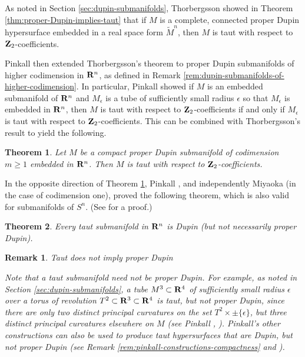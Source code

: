 \documentclass[12pt]{article}
\newtheorem{theorem}{Theorem}[section]
\newtheorem{remark}{Remark}[section]
\begin{document}
{As noted in Section \ref{sec:dupin-submanifolds},
Thorbergsson \cite{Th1} showed in Theorem \ref{thm:proper-Dupin-implies-taut}
that if $M$ is a complete, connected proper
Dupin hypersurface embedded in a real space form $\widetilde{M}^n$, then $M$ is taut with respect to 
${\bf Z}_2$-coefficients.


Pinkall \cite{P4} then extended Thorbergsson's theorem
 to proper Dupin submanifolds of higher codimension in ${\bf R}^n$, 
as defined in Remark \ref{rem:dupin-submanifolds-of-higher-codimension}.
In particular, Pinkall  showed if $M$ is an embedded submanifold of ${\bf R}^n$
and $M_{\epsilon}$ is a tube of sufficiently small radius $\epsilon$
so that $M_{\epsilon}$ is
embedded in ${\bf R}^n$, then $M$ is taut with respect to 
${\bf Z}_2$-coefficients if and only if $M_{\epsilon}$ is taut
with respect to ${\bf Z}_2$-coefficients.  This can be combined
with Thorbergsson's result to yield the following.
\begin{theorem}
\label{thm:taut-codimension-greater-than-1}
Let $M$ be a compact proper Dupin submanifold of codimension $m \geq 1$ embedded in ${\bf R}^n$.
Then $M$ is taut with respect to ${\bf Z}_2$-coefficients.
\end{theorem}

In the opposite direction of Theorem \ref{thm:taut-codimension-greater-than-1},
Pinkall \cite{P4}, and independently Miyaoka \cite{Mi8} (in the case of codimension one), proved the following
theorem, which is also valid for submanifolds of $S^n$. 
(See  \cite[pp. 68--71]{CR8} for a proof.)


\begin{theorem}
\label{thm:taut-implies-dupin} 
Every taut submanifold in ${\bf R}^n$ is Dupin (but not necessarily proper Dupin).
\end{theorem}

\begin{remark}{Taut does not imply proper Dupin}
\label{rem:dupin-not-proper}

\noindent
{\rm Note that a taut
submanifold need not be proper Dupin.  For example, as noted in Section \ref{sec:dupin-submanifolds}, 
a tube $M^3 \subset {\bf R}^4$ of sufficiently small radius $\epsilon$ over a torus of
revolution $T^2 \subset {\bf R}^3 \subset {\bf R}^4$ is taut,
but not proper Dupin, since there are only two distinct principal
curvatures on the set $T^2 \times \pm \{\epsilon\}$, but three distinct
principal curvatures elsewhere on $M$ (see Pinkall \cite{P2}, \cite[p. 69]{Cec9}).  
Pinkall's other constructions can also be used to produce taut 
hypersurfaces that are Dupin, but not proper Dupin (see  Remark \ref{rem:pinkall-constructions-compactness}
 and \cite[pp. 185--190]{CR7}).}
\end{remark}


}
\end{document}
